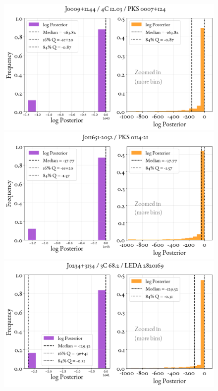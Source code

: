 \begin{figure}
    \centering
    \includegraphics[width=0.8\linewidth]{figures/ResultPosteriors/111_Posterior_5325.png}\\
     \includegraphics[width=0.8\linewidth]{figures/ResultPosteriors/112_Posterior_5348.png}\\
      \includegraphics[width=0.8\linewidth]{figures/ResultPosteriors/113_Posterior_5349.png}  
\end{figure}

